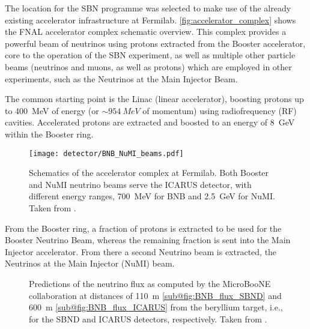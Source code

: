 The location for the SBN programme was selected to make use of the already existing accelerator infrastructure at Fermilab. \autoref{fig:accelerator_complex} shows the FNAL accelerator complex schematic overview. This complex provides a powerful beam of neutrinos using protons extracted from the Booster accelerator, core to the operation of the SBN experiment, as well as multiple other particle beams (neutrinos and muons, as well as protons) which are employed in other experiments, such as the Neutrinos at the Main Injector Beam. 

The common starting point is the Linac (linear accelerator), boosting protons up to \SI{400}{MeV} of energy (or $\sim\SI{954}{MeV}$ of momentum) using radiofrequency (RF) cavities. Accelerated protons are extracted and boosted to an energy of \SI{8}{GeV} within the Booster ring. 

\begin{figure}
    \centering
    \texttt{[image: detector/BNB\_NuMI\_beams.pdf]}
    \caption[Fermilab Accelerator complex]{Schematics of the accelerator complex at Fermilab. Both Booster and NuMI neutrino beams serve the ICARUS detector, with different energy  ranges, \SI{700}{MeV} for BNB and \SI{2.5}{GeV} for NuMI. Taken from \cite{ainsworthHighIntensityOperation2020}.}
    \label{fig:accelerator_complex}
\end{figure}

From the Booster ring, a fraction of protons is extracted to be used for the Booster Neutrino Beam, whereas the remaining fraction is sent into the Main Injector accelerator. From there a second Neutrino beam is extracted, the Neutrinos at the Main Injector (NuMI) beam. 

\begin{figure}
    \centering

    \caption[BNB flux predictions at the near and far detectors]{Predictions of the neutrino flux as computed by the MicroBooNE collaboration \cite{miniboonecollaborationNeutrinoFluxPrediction2009} at distances of \SI{110}{m} \ref{sub@fig:BNB_flux_SBND} and \SI{600}{m} \ref{sub@fig:BNB_flux_ICARUS} from the beryllium target, i.e., for the SBND and ICARUS detectors, respectively. Taken from \cite{acciarriProposalThreeDetector2015}. }
    \label{fig:BNB_flux}
\end{figure}

